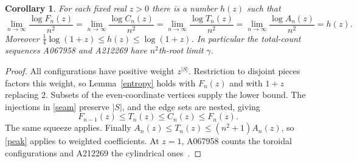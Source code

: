 \documentclass[10pt]{article}
\newtheorem{corollary}[theorem]{Corollary}
\newcommand{\gam}{\gamma}
\begin{document}
\begin{corollary}\label{weighted}
For each fixed real $z>0$ there is a number $h(z)$ such that
\[
 \lim_{n\to\infty}\frac{\log F_n(z)}{n^2}
 =\lim_{n\to\infty}\frac{\log C_n(z)}{n^2}
 =\lim_{n\to\infty}\frac{\log T_n(z)}{n^2}
 =\lim_{n\to\infty}\frac{\log A_n(z)}{n^2}=h(z).
\]
Moreover $\frac14\log(1+z)\leq h(z)\leq\log(1+z)$.
In particular the total-count sequences A067958 and A212269 have
$n^2$th-root limit $\gam$.
\end{corollary}
\begin{proof}
All configurations have positive weight $z^{|S|}$. Restriction to
disjoint pieces factors this weight, so Lemma~\ref{entropy} holds
with $F_n(z)$ and with $1+z$ replacing $2$. Subsets of the
even-coordinate vertices supply the lower bound. The injections in
\eqref{seam} preserve $|S|$, and the edge sets are nested, giving
\[
 F_{n-1}(z)\leq T_n(z)\leq C_n(z)\leq F_n(z).
\]
The same squeeze applies. Finally
$A_n(z)\leq T_n(z)\leq(n^2+1)A_n(z)$, so \eqref{peak} applies
to weighted coefficients. At $z=1$, A067958 counts the toroidal
configurations and A212269 the cylindrical ones~\cite{boundaries}.
\end{proof}
\end{document}
